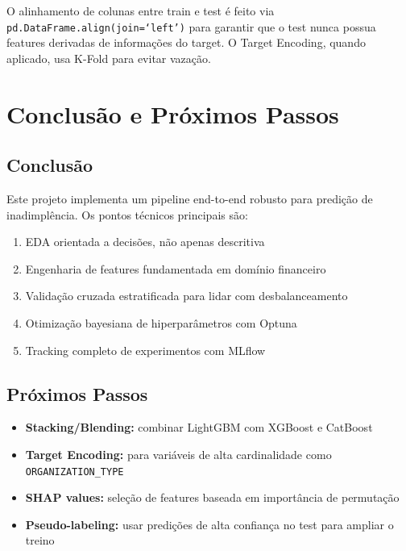 \documentclass[12pt, a4paper]{article}
\begin{document}
O alinhamento de colunas entre train e test \'e feito via
\texttt{pd.DataFrame.align(join=`left')} para garantir que o test nunca possua features
derivadas de informa\c{c}\~oes do target. O Target Encoding, quando aplicado, usa
K-Fold para evitar vaza\c{c}\~ao.

\section{Conclus\~ao e Pr\'oximos Passos}

\subsection{Conclus\~ao}

Este projeto implementa um pipeline end-to-end robusto para predi\c{c}\~ao de
inadimpl\^encia. Os pontos t\'ecnicos principais s\~ao:

\begin{enumerate}
    \item EDA orientada a decis\~oes, n\~ao apenas descritiva
    \item Engenharia de features fundamentada em dom\'inio financeiro
    \item Valida\c{c}\~ao cruzada estratificada para lidar com desbalanceamento
    \item Otimiza\c{c}\~ao bayesiana de hiperpar\^ametros com Optuna
    \item Tracking completo de experimentos com MLflow
\end{enumerate}

\subsection{Pr\'oximos Passos}

\begin{itemize}
    \item \textbf{Stacking/Blending:} combinar LightGBM com XGBoost e CatBoost
    \item \textbf{Target Encoding:} para vari\'aveis de alta cardinalidade como
          \texttt{ORGANIZATION\_TYPE}
    \item \textbf{SHAP values:} sele\c{c}\~ao de features baseada em importância de permuta\c{c}\~ao
    \item \textbf{Pseudo-labeling:} usar predi\c{c}\~oes de alta confiança no test
          para ampliar o treino
\end{itemize}
\end{document}
